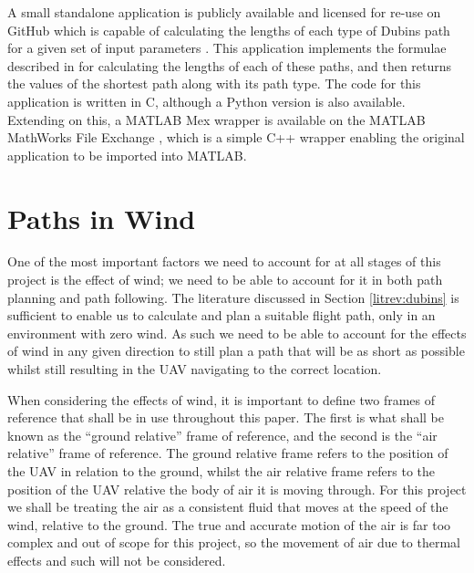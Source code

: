 A small standalone application is publicly available and licensed for re-use on GitHub which is capable of calculating the lengths of each type of Dubins path for a given set of input parameters \cite{WalkerDubinsCurves}. This application implements the formulae described in \cite{shkel2001classification} for calculating the lengths of each of these paths, and then returns the values of the shortest path along with its path type. The code for this application is written in C, although a Python version is also available. Extending on this, a MATLAB Mex wrapper is available on the MATLAB MathWorks File Exchange \cite{MexDubinsCurves}, which is a simple C++ wrapper enabling the original application to be imported into MATLAB.


\section{Paths in Wind}
\label{litrev:path}

One of the most important factors we need to account for at all stages of this project is the effect of wind; we need to be able to account for it in both path planning and path following. The literature discussed in Section \ref{litrev:dubins} is sufficient to enable us to calculate and plan a suitable flight path, only in an environment with zero wind. As such we need to be able to account for the effects of wind in any given direction to still plan a path that will be as short as possible whilst still resulting in the UAV navigating to the correct location.

When considering the effects of wind, it is important to define two frames of reference that shall be in use throughout this paper. The first is what shall be known as the ``ground relative'' frame of reference, and the second is the ``air relative'' frame of reference. The ground relative frame refers to the position of the UAV in relation to the ground, whilst the air relative frame refers to the position of the UAV relative the body of air it is moving through. For this project we shall be treating the air as a consistent fluid that moves at the speed of the wind, relative to the ground. The true and accurate motion of the air is far too complex and out of scope for this project, so the movement of air due to thermal effects and such will not be considered. 

